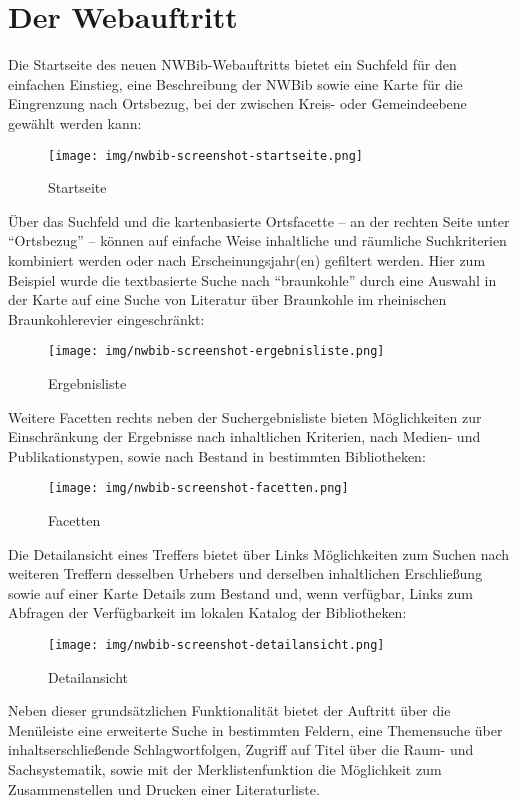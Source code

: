 \documentclass[a4paper,
fontsize=11pt,
oneside,
numbers=noperiodatend,
parskip=half-,
bibliography=totoc,
final
]{scrartcl}
\begin{document}
\section*{Der Webauftritt}\label{der-webauftritt}

Die Startseite des neuen NWBib-Webauftritts bietet ein Suchfeld für den
einfachen Einstieg, eine Beschreibung der NWBib sowie eine Karte für die
Eingrenzung nach Ortsbezug, bei der zwischen Kreis- oder Gemeindeebene
gewählt werden kann:

\begin{figure}[htbp]
\centering
\texttt{[image: img/nwbib-screenshot-startseite.png]}
\caption{Startseite}
\end{figure}

Über das Suchfeld und die kartenbasierte Ortsfacette -- an der rechten
Seite unter \enquote{Ortsbezug} -- können auf einfache Weise inhaltliche
und räumliche Suchkriterien kombiniert werden oder nach
Erscheinungsjahr(en) gefiltert werden. Hier zum Beispiel wurde die
textbasierte Suche nach \enquote{braunkohle} durch eine Auswahl in der
Karte auf eine Suche von Literatur über Braunkohle im rheinischen
Braunkohlerevier eingeschränkt:

\begin{figure}[htbp]
\centering
\texttt{[image: img/nwbib-screenshot-ergebnisliste.png]}
\caption{Ergebnisliste}
\end{figure}

Weitere Facetten rechts neben der Suchergebnisliste bieten Möglichkeiten
zur Einschränkung der Ergebnisse nach inhaltlichen Kriterien, nach
Medien- und Publikationstypen, sowie nach Bestand in bestimmten
Bibliotheken:

\begin{figure}[htbp]
\centering
\texttt{[image: img/nwbib-screenshot-facetten.png]}
\caption{Facetten}
\end{figure}

Die Detailansicht eines Treffers bietet über Links Möglichkeiten zum
Suchen nach weiteren Treffern desselben Urhebers und derselben
inhaltlichen Erschließung sowie auf einer Karte Details zum Bestand und,
wenn verfügbar, Links zum Abfragen der Verfügbarkeit im lokalen Katalog
der Bibliotheken:

\begin{figure}[htbp]
\centering
\texttt{[image: img/nwbib-screenshot-detailansicht.png]}
\caption{Detailansicht}
\end{figure}

Neben dieser grundsätzlichen Funktionalität bietet der Auftritt über die
Menüleiste eine erweiterte Suche in bestimmten Feldern, eine Themensuche
über inhaltserschließende Schlagwortfolgen, Zugriff auf Titel über die
Raum- und Sachsystematik, sowie mit der Merklistenfunktion die
Möglichkeit zum Zusammenstellen und Drucken einer Literaturliste.
\end{document}
